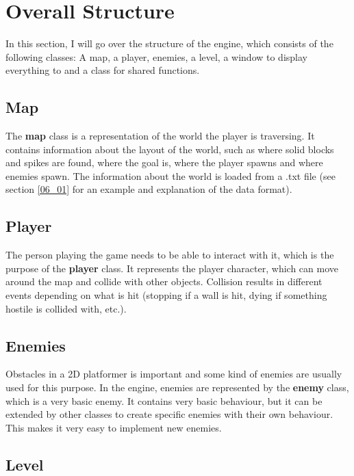 \section{Overall Structure}
\label{03}

In this section, I will go over the structure of the engine, which consists of the following classes: A map, a player, enemies, a level, a window to display everything to and a class for shared functions.

\subsection*{Map}
\label{03_01_01}

The \textbf{map} class is a representation of the world the player is traversing. It contains information about the layout of the world, such as where solid blocks and spikes are found, where the goal is, where the player spawns and where enemies spawn. The information about the world is loaded from a .txt file (see section \ref{06_01} for an example and explanation of the data format).

\subsection*{Player}
\label{03_01_02}

The person playing the game needs to be able to interact with it, which is the purpose of the \textbf{player} class. It represents the player character, which can move around the map and collide with other objects. Collision results in different events depending on what is hit (stopping if a wall is hit, dying if something hostile is collided with, etc.).

\subsection*{Enemies}
\label{03_01_03}

Obstacles in a 2D platformer is important and some kind of enemies are usually used for this purpose. In the engine, enemies are represented by the \textbf{enemy} class, which is a very basic enemy. It contains very basic behaviour, but it can be extended by other classes to create specific enemies with their own behaviour. This makes it very easy to implement new enemies.

\subsection*{Level}
\label{03_01_04}

